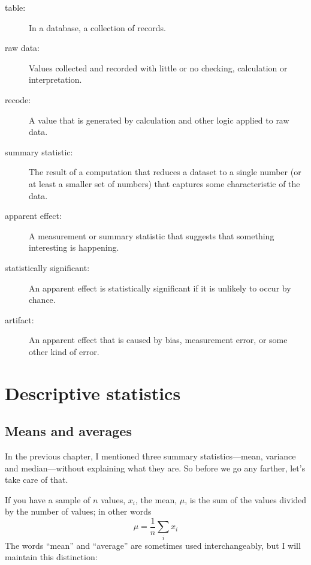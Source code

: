 \documentclass[12pt]{book}
\begin{document}
\begin{description}
\item[table:] In a database, a collection of records.

\item[raw data:] Values collected and recorded with little or no
checking, calculation or interpretation.

\item[recode:] A value that is generated by calculation and other
logic applied to raw data.

\item[summary statistic:] The result of a computation that reduces
a dataset to a single number (or at least a smaller set of numbers)
that captures some characteristic of the data.

\item[apparent effect:] A measurement or summary statistic that
suggests that something interesting is happening.

\item[statistically significant:] An apparent effect is statistically
  significant if it is unlikely to occur by chance.

\item[artifact:] An apparent effect that is caused by bias,
  measurement error, or some other kind of error.

\end{description}





\chapter{Descriptive statistics}
\label{descriptive}

\section{Means and averages}
\label{mean}

In the previous chapter, I mentioned three summary statistics---mean,
variance and median---without explaining what they are.  So before
we go any farther, let's take care of that.


If you have a sample of $n$ values, $x_i$, the mean, $\mu$, is
the sum of the values divided by the number of values; in other words
%
\[ \mu = \frac{1}{n} \sum_i x_i \]
%
The words ``mean'' and ``average'' are sometimes used interchangeably,
but I will maintain this distinction:
\end{document}
